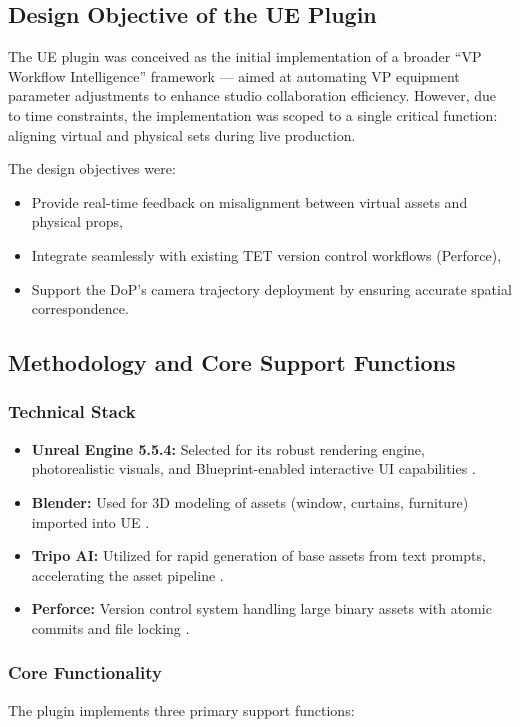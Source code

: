 \documentclass[12pt,a4paper]{report}
\begin{document}
\subsection{Design Objective of the UE Plugin}
The UE plugin was conceived as the initial implementation of a broader ``VP Workflow Intelligence'' framework — aimed at automating VP equipment parameter adjustments to enhance studio collaboration efficiency. However, due to time constraints, the implementation was scoped to a single critical function: aligning virtual and physical sets during live production.

The design objectives were:
\begin{itemize}
    \item Provide real-time feedback on misalignment between virtual assets and physical props,
    \item Integrate seamlessly with existing TET version control workflows (Perforce),
    \item Support the DoP's camera trajectory deployment by ensuring accurate spatial correspondence.
\end{itemize}

\subsection{Methodology and Core Support Functions}
\subsubsection{Technical Stack}
\begin{itemize}
    \item \textbf{Unreal Engine 5.5.4:} Selected for its robust rendering engine, photorealistic visuals, and Blueprint-enabled interactive UI capabilities \cite{wll1}.
    \item \textbf{Blender:} Used for 3D modeling of assets (window, curtains, furniture) imported into UE \cite{wll2}.
    \item \textbf{Tripo AI:} Utilized for rapid generation of base assets from text prompts, accelerating the asset pipeline \cite{wll3}.
    \item \textbf{Perforce:} Version control system handling large binary assets with atomic commits and file locking \cite{wll4}.
\end{itemize}

\subsubsection{Core Functionality}
The plugin implements three primary support functions:
\end{document}
